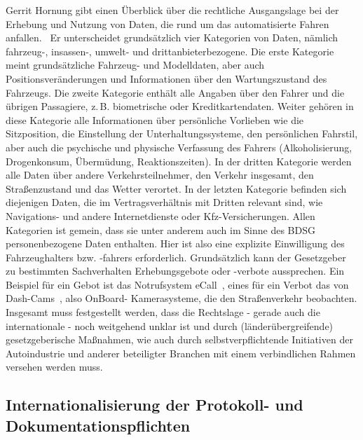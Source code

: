 \documentclass[twoside,a4paper,12pt]{article}
\begin{document}
Gerrit Hornung gibt einen Überblick über die rechtliche Ausgangslage bei der Erhebung und Nutzung von Daten, die rund um das automatisierte Fahren
anfallen.~\cite{ho} Er unterscheidet grundsätzlich vier Kategorien von Daten, nämlich fahrzeug-, insassen-, umwelt- und 
drittanbieterbezogene. Die erste Kategorie meint grundsätzliche Fahrzeug- und Modelldaten, aber auch Positionsveränderungen und Informationen über den
Wartungszustand des Fahrzeugs. Die zweite Kategorie enthält alle Angaben über den Fahrer und die übrigen Passagiere, z.\,B. biometrische oder Kreditkartendaten.
Weiter gehören in diese Kategorie alle Informationen über persönliche Vorlieben wie die Sitzposition, die Einstellung der Unterhaltungssysteme, den
persönlichen Fahrstil, aber auch die psychische und physische Verfassung des Fahrers (Alkoholisierung, Drogenkonsum, Übermüdung, Reaktionszeiten).
In der dritten Kategorie werden alle Daten über andere Verkehrsteilnehmer, den Verkehr insgesamt, den Straßenzustand und das Wetter verortet.
In der letzten Kategorie befinden sich diejenigen Daten, die im Vertragsverhältnis mit Dritten relevant sind, wie Navigations- und andere Internetdienste oder
Kfz-Versicherungen.
Allen Kategorien ist gemein, dass sie unter anderem auch im Sinne des BDSG personenbezogene Daten enthalten. Hier ist also eine explizite Einwilligung
des Fahrzeughalters bzw. -fahrers erforderlich. Grundsätzlich kann der Gesetzgeber zu bestimmten Sachverhalten Erhebungsgebote oder -verbote aussprechen.
Ein Beispiel für ein Gebot ist das Notrufsystem eCall\mbox{~\cite[S. 362]{ho}}, eines für ein Verbot das von Dash-Cams\mbox{~\cite[S. 363]{ho}}, also OnBoard-
Kamerasysteme, die den Straßenverkehr beobachten. Insgesamt muss festgestellt werden, dass die Rechtslage - gerade auch die internationale - noch weitgehend 
unklar ist und durch (länderübergreifende) gesetzgeberische Maßnahmen, wie auch durch selbstverpflichtende Initiativen der Autoindustrie und anderer beteiligter 
Branchen mit einem verbindlichen Rahmen versehen werden muss.

\subsection{Internationalisierung der Protokoll- und Dokumentationspflichten} \label{InternationaleStandardisierungDerProtokollUndDokumentationspflichten}
\end{document}
